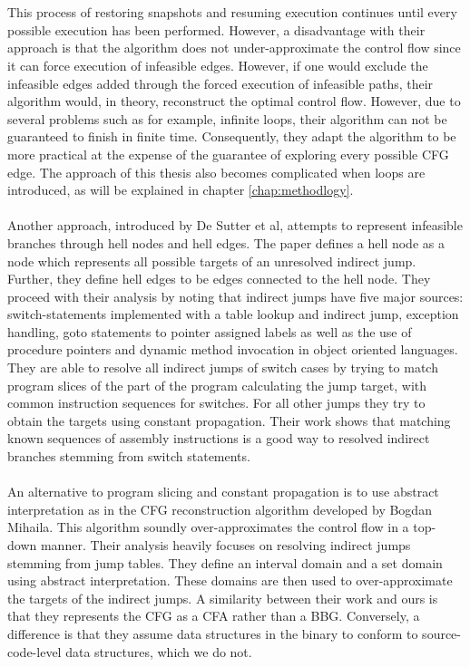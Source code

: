\documentclass{kththesis}
\begin{document}
\\ \\
This process of restoring snapshots and resuming execution continues until every possible execution has been performed. However, a disadvantage with their approach is that the algorithm does not under-approximate the control flow since it can force execution of infeasible edges. However, if one would exclude the infeasible edges added through the forced execution of infeasible paths, their algorithm would, in theory, reconstruct the optimal control flow. However, due to several problems such as for example, infinite loops, their algorithm can not be guaranteed to finish in finite time. Consequently, they adapt the algorithm to be more practical at the expense of the guarantee of exploring every possible CFG edge. The approach of this thesis also becomes complicated when loops are introduced, as will be explained in chapter \ref{chap:methodlogy}.
\\ \\
Another approach, introduced by De Sutter et al\cite{staticOfInd}, attempts to represent infeasible branches through hell nodes and hell edges. The paper defines a hell node as a node which represents all possible targets of an unresolved indirect jump. Further, they define hell edges to be edges connected to the hell node. They proceed with their analysis by noting that indirect jumps have five major sources: switch-statements implemented with a table lookup and indirect jump, exception handling, goto statements to pointer assigned labels as well as the use of procedure pointers and dynamic method invocation in object oriented languages. They are able to resolve all indirect jumps of switch cases by trying to match program slices of the part of the program calculating the jump target, with common instruction sequences for switches. For all other jumps they try to obtain the targets using constant propagation. Their work shows that matching known sequences of assembly instructions is a good way to resolved indirect branches stemming from switch statements. 
\\ \\
An alternative to program slicing and constant propagation is to use abstract interpretation as in the CFG reconstruction algorithm developed by Bogdan Mihaila\parencite{CFGFromPowerPC}. This algorithm soundly over-approximates the control flow in a top-down manner. Their analysis heavily focuses on resolving indirect jumps stemming from jump tables. They define an interval domain and a set domain using abstract interpretation. These domains are then used to over-approximate the targets of the indirect jumps. A similarity between their work and ours is that they represents the CFG as a CFA rather than a BBG. Conversely, a difference is that they assume data structures in the binary to conform to source-code-level data structures, which we do not. 
\end{document}
